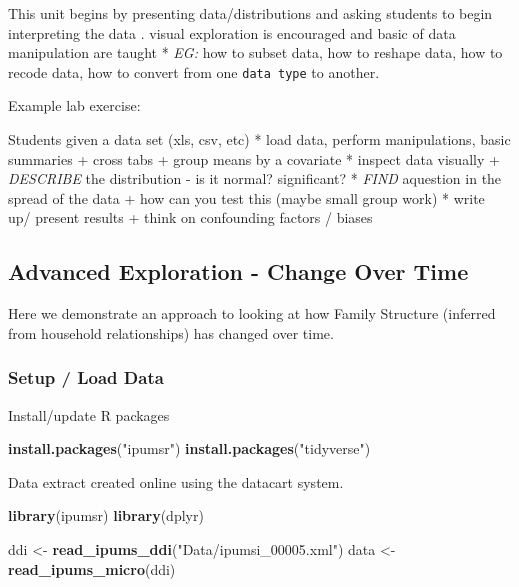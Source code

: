 \documentclass[
]{book}
\newenvironment{Shaded}{\begin{snugshade}}{\end{snugshade}}
\newcommand{\FunctionTok}[1]{\textcolor[rgb]{0.13,0.29,0.53}{\textbf{#1}}}
\newcommand{\NormalTok}[1]{#1}
\newcommand{\OtherTok}[1]{\textcolor[rgb]{0.56,0.35,0.01}{#1}}
\newcommand{\StringTok}[1]{\textcolor[rgb]{0.31,0.60,0.02}{#1}}
\begin{document}
This unit begins by presenting data/distributions and asking students to begin interpreting the data . visual exploration is encouraged and basic of data manipulation are taught
* \emph{EG:} how to subset data, how to reshape data, how to recode data, how to convert from one \texttt{data\ type} to another.

Example lab exercise:

Students given a data set (xls, csv, etc)
* load data, perform manipulations, basic summaries
+ cross tabs
+ group means by a covariate
* inspect data visually
+ \emph{DESCRIBE} the distribution - is it normal? significant?
* \emph{FIND} aquestion in the spread of the data
+ how can you test this (maybe small group work)
* write up/ present results
+ think on confounding factors / biases

\hypertarget{advanced-exploration---change-over-time}{%
\subsection*{Advanced Exploration - Change Over Time}\label{advanced-exploration---change-over-time}}

Here we demonstrate an approach to looking at how Family Structure (inferred from household relationships) has changed over time.

\hypertarget{setup-load-data}{%
\subsubsection*{Setup / Load Data}\label{setup-load-data}}

Install/update R packages

\begin{Shaded}
\begin{Highlighting}[]
\FunctionTok{install.packages}\NormalTok{(}\StringTok{"ipumsr"}\NormalTok{)}
\FunctionTok{install.packages}\NormalTok{(}\StringTok{"tidyverse"}\NormalTok{)}
\end{Highlighting}
\end{Shaded}

Data extract created online using the datacart system.

\begin{Shaded}
\begin{Highlighting}[]
\FunctionTok{library}\NormalTok{(ipumsr)}
\FunctionTok{library}\NormalTok{(dplyr)}


\NormalTok{ddi }\OtherTok{\textless{}{-}} \FunctionTok{read\_ipums\_ddi}\NormalTok{(}\StringTok{"Data/ipumsi\_00005.xml"}\NormalTok{)}
\NormalTok{data }\OtherTok{\textless{}{-}} \FunctionTok{read\_ipums\_micro}\NormalTok{(ddi)}
\end{Highlighting}
\end{Shaded}
\end{document}
